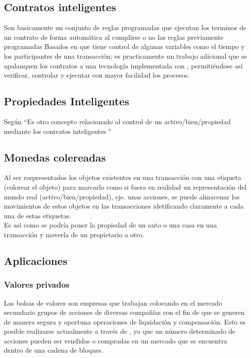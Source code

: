 \subsection{Contratos inteligentes}
Son basicamente un conjunto de reglas programadas que ejecutan los terminos de un contrato de forma automática al cumplirse o no las reglas previamente programadas \citep{crosby2016blockchain}
Basados en que \blckchn  tiene control de algunas variables como el tiempo \citep{kosba2016hawk} y los participantes de una transacción; es practicamente un trabajo adicional que se apalanquen los contratos a una tecnología implementada con \blckchn, permitiéndose así  verificar, controlar y ejecutar con mayor facilidad los procesos.

\subsection{Propiedades Inteligentes}
Según \citep{crosby2016blockchain} ``Es otro concepto relacionado al control de un activo/bien/propiedad mediante los contratos inteligentes "


\subsection{Monedas colereadas}
Al ser respresentados los objetos existentes en una transacción con una etiqueta (colorear el objeto) para marcarlo como si fuera en realidad un representación del mundo real (activo/bien/propiedad), eje. unas acciones, se puede almacenar los movimientos de estos objetos en las transacciones idetificando claramente a cada una de estas etiquetas.
\\
Es asi como se podría poner la propiedad de un auto o una casa en una transacción y moverla de un propietario a otro. \citep{crosby2016blockchain}



\subsection{Aplicaciones}

\subsubsection{Valores privados}
Las bolsas de valores son empresas que trabajan colocando en el mercado secundario grupos de acciones de diversas compañías con el fin de que se generen de manera segura y oportuna operaciones de liquidación y compensación. Esto es posible realizarse actualmente a través de \blckchn, ya que un número determinado de acciones pueden ser vendidas o compradas en un mercado que se encuentra dentro de una cadena de bloques. \citep{crosby2016blockchain}

